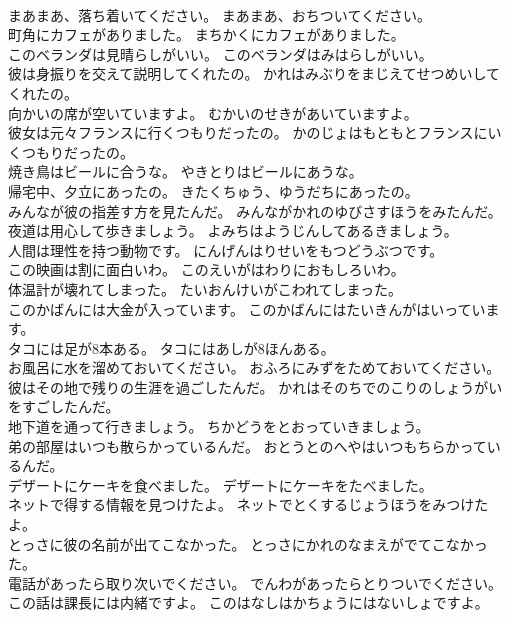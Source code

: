 \documentclass[8pt]{extreport}
\begin{document}
\begin{CJK}{UTF8}{min}
\\	まあまあ、落ち着いてください。	まあまあ、おちついてください。 
\\	町角にカフェがありました。	まちかくにカフェがありました。 
\\	このベランダは見晴らしがいい。	このベランダはみはらしがいい。 
\\	彼は身振りを交えて説明してくれたの。	かれはみぶりをまじえてせつめいしてくれたの。 
\\	向かいの席が空いていますよ。	むかいのせきがあいていますよ。 
\\	彼女は元々フランスに行くつもりだったの。	かのじょはもともとフランスにいくつもりだったの。 
\\	焼き鳥はビールに合うな。	やきとりはビールにあうな。 
\\	帰宅中、夕立にあったの。	きたくちゅう、ゆうだちにあったの。 
\\	みんなが彼の指差す方を見たんだ。	みんながかれのゆびさすほうをみたんだ。 
\\	夜道は用心して歩きましょう。	よみちはようじんしてあるきましょう。 
\\	人間は理性を持つ動物です。	にんげんはりせいをもつどうぶつです。 
\\	この映画は割に面白いわ。	このえいがはわりにおもしろいわ。 
\\	体温計が壊れてしまった。	たいおんけいがこわれてしまった。 
\\	このかばんには大金が入っています。	このかばんにはたいきんがはいっています。 
\\	タコには足が8本ある。	タコにはあしが8ほんある。 
\\	お風呂に水を溜めておいてください。	おふろにみずをためておいてください。 
\\	彼はその地で残りの生涯を過ごしたんだ。	かれはそのちでのこりのしょうがいをすごしたんだ。 
\\	地下道を通って行きましょう。	ちかどうをとおっていきましょう。 
\\	弟の部屋はいつも散らかっているんだ。	おとうとのへやはいつもちらかっているんだ。 
\\	デザートにケーキを食べました。	デザートにケーキをたべました。 
\\	ネットで得する情報を見つけたよ。	ネットでとくするじょうほうをみつけたよ。 
\\	とっさに彼の名前が出てこなかった。	とっさにかれのなまえがでてこなかった。 
\\	電話があったら取り次いでください。	でんわがあったらとりついでください。 
\\	この話は課長には内緒ですよ。	このはなしはかちょうにはないしょですよ。 

\end{CJK}
\end{document}
